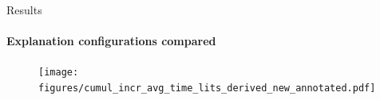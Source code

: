 \documentclass[handout]{beamer}
\begin{document}
%
%	
%


\begin{frame}{Results}
	\framesubtitle{Explanation configurations compared}
	\begin{figure}
		\texttt{[image: figures/cumul\_incr\_avg\_time\_lits\_derived\_new\_annotated.pdf]}
	\end{figure}
\end{frame}
\end{document}
